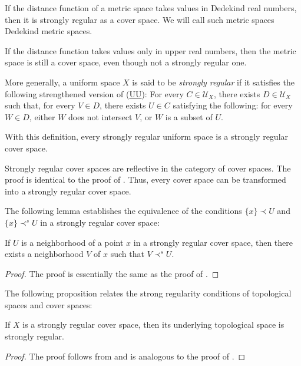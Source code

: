 \documentclass[pdflatex,sn-mathphys-num]{sn-jnl}
\newcommand{\axref}[1]{(\hyperref[ax:#1]{#1})}
\theoremstyle{definition}
\theoremstyle{remark}
\numberwithin{figure}{section}
\newcommand{\rb}{\prec}
\begin{document}
\begin{example}
If the distance function of a metric space takes values in Dedekind real numbers, then it is strongly regular as a cover space.
We will call such metric spaces {Dedekind metric spaces}.

If the distance function takes values only in upper real numbers, then the metric space is still a cover space, even though not a strongly regular one.
\end{example}

\begin{example}
More generally, a uniform space $X$ is said to be \emph{strongly regular} if it satisfies the following strengthened version of \axref{UU}:
For every $C \in \mathcal{U}_X$, there exists $D \in \mathcal{U}_X$ such that, for every $V \in D$,
there exists $U \in C$ satisfying the following: for every $W \in D$, either $W$ does not intersect $V$, or $W$ is a subset of $U$.

With this definition, every strongly regular uniform space is a strongly regular cover space.
\end{example}

\begin{example}
Strongly regular cover spaces are reflective in the category of cover spaces.
The proof is identical to the proof of .
Thus, every cover space can be transformed into a strongly regular cover space.
\end{example}

The following lemma establishes the equivalence of the conditions $\{ x \} \rb U$ and $\{ x \} \rb^s U$ in a strongly regular cover space:

\begin{lem}
If $U$ is a neighborhood of a point $x$ in a strongly regular cover space, then there exists a neighborhood $V$ of $x$ such that $V \rb^s U$.
\end{lem}
\begin{proof}
The proof is essentially the same as the proof of .
\end{proof}

The following proposition relates the strong regularity conditions of topological spaces and cover spaces:

\begin{prop}
If $X$ is a strongly regular cover space, then its underlying topological space is strongly regular.
\end{prop}
\begin{proof}
The proof follows from  and is analogous to the proof of .
\end{proof}
\end{document}
